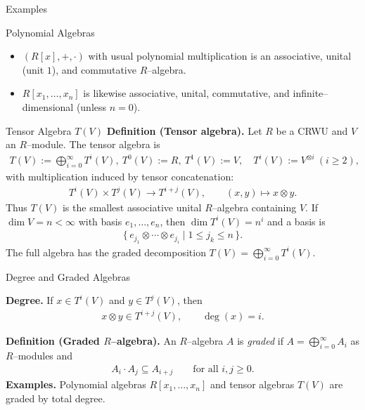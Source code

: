 \begin{frame}{Examples}
\begin{block}{Polynomial Algebras}
\begin{itemize}
\item $(R[x],+,\cdot)$ with usual polynomial multiplication is an associative, unital (unit $1$), and commutative $R$–algebra.
\item $R[x_1,\dots,x_n]$ is likewise associative, unital, commutative, and infinite–dimensional (unless $n=0$).
\end{itemize}
\end{block}
\end{frame}

\begin{frame}{Tensor Algebra $T(V)$}
\textbf{Definition (Tensor algebra).}
Let $R$ be a CRWU and $V$ an $R$–module. The tensor algebra is
\begin{align*}
T(V):=\bigoplus_{i=0}^\infty T^i(V), \ T^0(V):=R,\ T^1(V):=V,\quad T^i(V):=V^{\otimes i}\ (i\ge 2),
\end{align*}
with multiplication induced by tensor concatenation:
\begin{align*}
T^i(V)\times T^j(V)\to T^{i+j}(V),\qquad (x,y)\mapsto x\otimes y.
\end{align*}
Thus $T(V)$ is the smallest associative unital $R$–algebra containing $V$.
If $\dim V = n < \infty$ with basis $e_1,\dots,e_n$, then $\dim T^i(V)=n^i$ and a basis is
\begin{align*}
\{\, e_{j_1}\otimes \cdots \otimes e_{j_i} \mid 1\le j_k\le n \,\}.
\end{align*}
The full algebra has the graded decomposition $T(V)=\bigoplus_{i=0}^\infty T^i(V)$.
\end{frame}

\begin{frame}{Degree and Graded Algebras}
\begin{block}{}
\textbf{Degree.} If $x\in T^i(V)$ and $y\in T^j(V)$, then
\begin{align*}
x\otimes y \in T^{i+j}(V),\qquad \deg(x)=i.
\end{align*}

\textbf{Definition (Graded $R$–algebra).}
An $R$–algebra $A$ is \emph{graded} if $A=\bigoplus_{i=0}^\infty A_i$ as $R$–modules and
\begin{align*}
A_i\cdot A_j \subseteq A_{i+j}\qquad \text{for all } i,j\ge 0.
\end{align*}
\textbf{Examples.} Polynomial algebras $R[x_1,\dots,x_n]$ and tensor algebras $T(V)$ are graded by total degree.
\end{block}
\end{frame}

